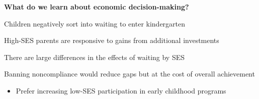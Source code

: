 \documentclass[t,aspectratio=169,11pt,presentation]{beamer}
\newenvironment{wideenumerate}{\enumerate\addtolength{\itemsep}{14pt}}{\endenumerate}
\begin{document}
\begin{frame}{\textbf{What do we learn about economic decision-making?}}
\begin{wideenumerate}
    \item Children negatively sort into waiting to enter kindergarten
    \item<2-> High-SES parents are responsive to gains from additional investments
    \item<3-> There are large differences in the effects of waiting by SES
    \item<4-> Banning noncompliance would reduce gaps but at the cost of overall achievement
    \begin{itemize}
        \item Prefer increasing low-SES participation in early childhood programs 
    \end{itemize}
        
\end{wideenumerate}
    
    
    
\end{frame}
\end{document}
